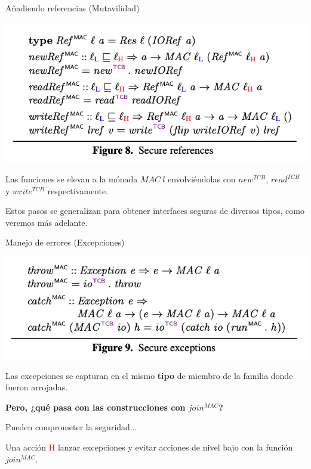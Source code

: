 \documentclass{beamer}
\begin{document}
\begin{frame}{Añadiendo referencias (Mutavilidad)}
    \begin{center}
        \includegraphics[scale=0.7]{figure8.png}
    \end{center}

    Las funciones se elevan a la mónada $MAC \ l$ envolviéndolas con $new^{TCB}$, $read^{TCB}$ y $write^{TCB}$ respectivamente. \pause

    Estos pasos se generalizan para obtener interfaces seguras de diversos tipos, como veremos más adelante.
\end{frame}

\begin{frame}{Manejo de errores (Excepciones)}
    \begin{center}
        \includegraphics[scale=0.7]{figure9.png}
    \end{center}

    Las excepciones se capturan en el mismo \textbf{tipo} de miembro de la familia donde fueron arrojadas.\newline\pause

    \textbf{Pero, ¿qué pasa con las construcciones con $join^{MAC}$?}
    
    Pueden comprometer la seguridad...
    
    Una acción \textcolor{red}{H} lanzar excepciones y evitar acciones de nivel bajo con la función $join^{MAC}$.
\end{frame}
\end{document}
